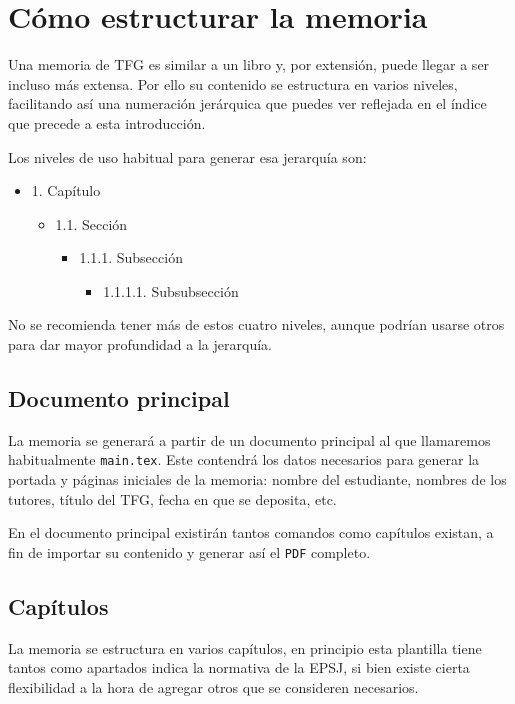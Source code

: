 \section{Cómo estructurar la memoria}

Una memoria de TFG es similar a un libro y, por extensión, puede llegar a ser incluso más extensa. Por ello su contenido se estructura en varios niveles, facilitando así una numeración jerárquica que puedes ver reflejada en el índice que precede a esta introducción.

Los niveles de uso habitual para generar esa jerarquía son:

\begin{itemize}
    \item 1. Capítulo
          \begin{itemize}
              \item 1.1. Sección
                    \begin{itemize}
                        \item 1.1.1. Subsección
                              \begin{itemize}
                                  \item 1.1.1.1. Subsubsección
                              \end{itemize}
                    \end{itemize}
          \end{itemize}
\end{itemize}

No se recomienda tener más de estos cuatro niveles, aunque podrían usarse otros para dar mayor profundidad a la jerarquía.

\subsection{Documento principal}

La memoria se generará a partir de un documento principal al que llamaremos habitualmente \texttt{main.tex}. Este contendrá los datos necesarios para generar la portada y páginas iniciales de la memoria: nombre del estudiante, nombres de los tutores, título del TFG, fecha en que se deposita, etc.

En el documento principal existirán tantos comandos \verb*|| como capítulos existan, a fin de importar su contenido y generar así el \verb*|PDF| completo.

\subsection{Capítulos}\label{Sec.Capitulos}
La memoria se estructura en varios capítulos, en principio esta plantilla tiene tantos como apartados indica la normativa de la EPSJ, si bien existe cierta flexibilidad a la hora de agregar otros que se consideren necesarios.

